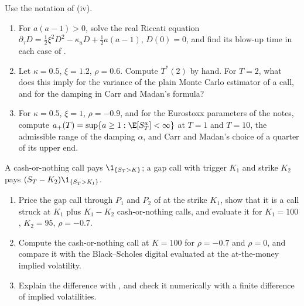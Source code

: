 \begin{exercise}\label{ex:sv-explosion}
\medium Use the notation of (iv).
\begin{enumerate}[label=(\alph*)]
  \item For $a(a-1)>0$, solve the real Riccati equation $\partial_\tau D=\frac12\xi^2D^2-\kappa_aD+\frac12a(a-1)$,
    $D(0)=0$, and find its blow-up time in each case of .
  \item Let $\kappa=0.5$, $\xi=1.2$, $\rho=0.6$. Compute $T^*(2)$ by hand. For $T=2$, what does this imply for the
    variance of the plain Monte Carlo estimator of a call, and for the damping in Carr and Madan's formula?
  \item For $\kappa=0.5$, $\xi=1$, $\rho=-0.9$, and for the Eurostoxx parameters of the notes, compute
    $a_+(T)=\sup\{a\ge1:\E[S_T^a]<\infty\}$ at $T=1$ and $T=10$, the admissible range of the damping $\alpha$, and
    Carr and Madan's choice of a quarter of its upper end.
\end{enumerate}
\end{exercise}

\begin{exercise}\label{ex:sv-digitals}
\medium A cash-or-nothing call pays $\1_{\{S_T>K\}}$; a gap call with trigger $K_1$ and strike $K_2$ pays
$(S_T-K_2)\1_{\{S_T>K_1\}}$.
\begin{enumerate}[label=(\alph*)]
  \item Price the gap call through $P_1$ and $P_2$ of  at the strike $K_1$, show that it is a
    call struck at $K_1$ plus $K_1-K_2$ cash-or-nothing calls, and evaluate it for $K_1=100$, $K_2=95$, $\rho=-0.7$.
  \item Compute the cash-or-nothing call at $K=100$ for $\rho=-0.7$ and $\rho=0$, and compare it with the
    Black--Scholes digital evaluated at the at-the-money implied volatility.
  \item Explain the difference with , and check it numerically with a finite
    difference of implied volatilities.
\end{enumerate}
\end{exercise}

